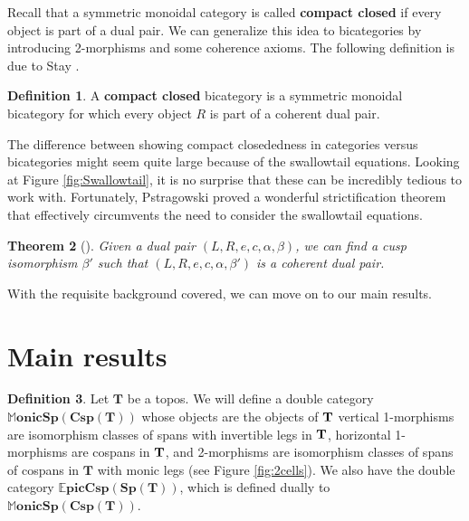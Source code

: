 \documentclass[11pt]{amsart}
\newcommand{\cat}[1]{\mathbf{#1}}
\newcommand{\dblmonspcsp}[1]{\mathbb{M}\mathbf{onicSp(Csp(#1))}}
\newcommand{\dblepiccspsp}[1]{\mathbb{E}\mathbf{picCsp(Sp(#1))}}
\newtheorem{thm}{Theorem}[section]
\theoremstyle{remark}
\theoremstyle{definition}
\newtheorem{defn}[thm]{Definition}
\begin{document}
Recall that a symmetric monoidal category is called 
\textbf{compact closed} if every object is part of a dual pair. 
We can generalize this idea to bicategories by 
introducing 2-morphisms and some coherence axioms. 
The following definition is due to Stay 
	\cite{Stay}.

\begin{defn}
	\label{def:CompClosdBicat}
	A \textbf{compact closed} bicategory is a symmetric monoidal bicategory for which
	every object $R$ 
	is part of a coherent dual pair. 
\end{defn}

The difference between showing compact closededness 
in categories versus bicategories might seem quite large 
because of the swallowtail equations.  
Looking at Figure 
	\ref{fig:Swallowtail}, 
it is no surprise that these can be incredibly tedious to work with.  
Fortunately, Pstragowski \cite{Piotr} proved a wonderful strictification theorem 
that effectively circumvents the need to consider the swallowtail equations.  

\begin{thm}[{\cite[p.~22]{Piotr}}]
	\label{thm:StrictingDualPairs}
	Given a dual pair $(L,R,e,c,\alpha,\beta)$, 
	we can find a cusp isomorphism $\beta'$ such that
	 $(L,R,e,c,\alpha,\beta')$ is a coherent dual pair.
\end{thm}

With the requisite background covered,
we can move on to our main results.

\section{Main results} %
\label{sec:SpansCospans}

\begin{defn}
\label{def:DblCatMonSpanCsp}
	Let $\cat{T}$ be a topos. 
	We will define a double category 
		$\dblmonspcsp{T}$ 
	whose objects are the objects of $\bold{T}$
	vertical 1-morphisms are isomorphism classes of spans with invertible legs in $\bold{T}$, 
	horizontal 1-morphisms are cospans in $\bold{T}$, and 
	2-morphisms are isomorphism classes of spans of cospans in $\cat{T}$ with monic legs 
	(see Figure \ref{fig:2cells}). 
	We also have the double category $\dblepiccspsp{T}$, 
	which is defined dually to $\dblmonspcsp{T}$. 
\end{defn}
\end{document}
